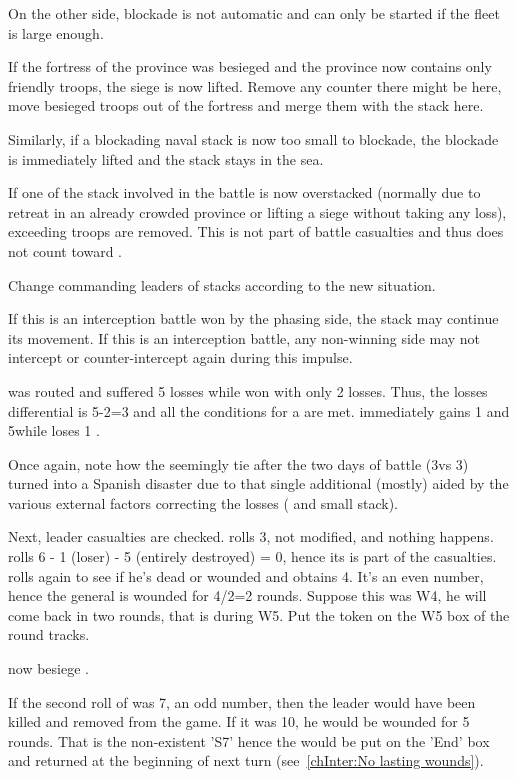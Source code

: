 On the other side, blockade is not automatic and can only be started if the
fleet is large enough.

If the fortress of the province was besieged and the province now contains
only friendly troops, the siege is now lifted. Remove any \USURE counter there
might be here, move besieged troops out of the fortress and merge them with
the stack here.

Similarly, if a blockading naval stack is now too small to blockade, the
blockade is immediately lifted and the stack stays in the sea.

If one of the stack involved in the battle is now overstacked (normally due to
retreat in an already crowded province or lifting a siege without taking any
loss), exceeding troops are removed. This is not part of battle casualties and
thus does not count toward .

Change commanding leaders of stacks according to the new situation.

If this is an interception battle won by the phasing side, the stack may
continue its movement. If this is an interception battle, any non-winning side
may not intercept or counter-intercept again during this impulse.

\begin{exemple}
  \HIS was routed and suffered 5 losses while \FRA won with only 2
  losses. Thus, the losses differential is 5-2=3 and all the conditions for a
   are met. \FRA immediately gains 1 \STAB and 5\VPs while
  \HIS loses 1 \STAB.

  Once again, note how the seemingly tie after the two days of battle
  (3\textetoile\textetoile\textetoile vs 3\textetoile\textetoile) turned into a
  Spanish disaster due to that single additional \textetoile (mostly) aided by
  the various external factors correcting the losses ( and small stack).

  Next, leader casualties are checked. \FRA rolls 3, not modified, and nothing
  happens. \HIS rolls 6 - 1 (loser) - 5 (entirely destroyed) = 0, hence its
  \LeaderG is part of the casualties. \HIS rolls again to see if he's dead or
  wounded and obtains 4. It's an even number, hence the general is wounded for
  4/2=2 rounds. Suppose this was W4, he will come back in two rounds, that is
  during W5. Put the token on the W5 box of the round tracks.

  \FRA now besiege \villeArras.

  \smallskip

  If the second roll of \HIS was 7, an odd number, then the leader would have
  been killed and removed from the game. If it was 10, he would be wounded for
  5 rounds. That is the non-existent 'S7' hence the \LeaderG would be put on
  the 'End' box and returned at the beginning of next turn
  (see~\ref{chInter:No lasting wounds}).
\end{exemple}

